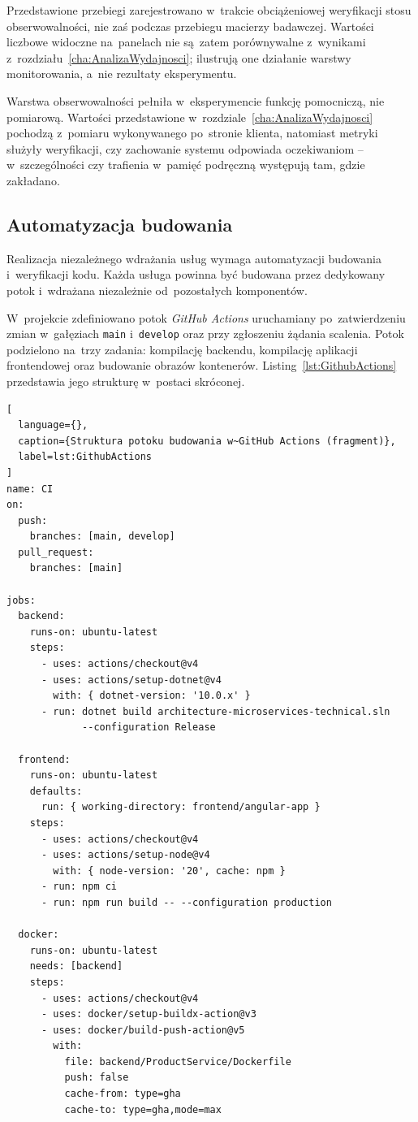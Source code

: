Przedstawione przebiegi zarejestrowano w~trakcie obciążeniowej weryfikacji stosu obserwowalności, nie zaś podczas przebiegu macierzy badawczej. Wartości liczbowe widoczne na~panelach nie są~zatem porównywalne z~wynikami z~rozdziału~\ref{cha:AnalizaWydajnosci}; ilustrują one działanie warstwy monitorowania, a~nie rezultaty eksperymentu.

Warstwa obserwowalności pełniła w~eksperymencie funkcję pomocniczą, nie pomiarową. Wartości przedstawione w~rozdziale~\ref{cha:AnalizaWydajnosci} pochodzą z~pomiaru wykonywanego po~stronie klienta, natomiast metryki służyły weryfikacji, czy zachowanie systemu odpowiada oczekiwaniom -- w~szczególności czy trafienia w~pamięć podręczną występują tam, gdzie zakładano.

\subsection{Automatyzacja budowania}
\label{subsec:CI}

Realizacja niezależnego wdrażania usług wymaga automatyzacji budowania i~weryfikacji kodu. Każda usługa powinna być budowana przez dedykowany potok i~wdrażana niezależnie od~pozostałych komponentów.

W~projekcie zdefiniowano potok \textit{GitHub Actions} uruchamiany po~zatwierdzeniu zmian w~gałęziach \texttt{main} i~\texttt{develop} oraz przy zgłoszeniu żądania scalenia. Potok podzielono na~trzy zadania: kompilację backendu, kompilację aplikacji frontendowej oraz budowanie obrazów kontenerów. Listing~\ref{lst:GithubActions} przedstawia jego strukturę w~postaci skróconej.

\begin{lstlisting}[
  language={},
  caption={Struktura potoku budowania w~GitHub Actions (fragment)},
  label=lst:GithubActions
]
name: CI
on:
  push:
    branches: [main, develop]
  pull_request:
    branches: [main]

jobs:
  backend:
    runs-on: ubuntu-latest
    steps:
      - uses: actions/checkout@v4
      - uses: actions/setup-dotnet@v4
        with: { dotnet-version: '10.0.x' }
      - run: dotnet build architecture-microservices-technical.sln
             --configuration Release

  frontend:
    runs-on: ubuntu-latest
    defaults:
      run: { working-directory: frontend/angular-app }
    steps:
      - uses: actions/checkout@v4
      - uses: actions/setup-node@v4
        with: { node-version: '20', cache: npm }
      - run: npm ci
      - run: npm run build -- --configuration production

  docker:
    runs-on: ubuntu-latest
    needs: [backend]
    steps:
      - uses: actions/checkout@v4
      - uses: docker/setup-buildx-action@v3
      - uses: docker/build-push-action@v5
        with:
          file: backend/ProductService/Dockerfile
          push: false
          cache-from: type=gha
          cache-to: type=gha,mode=max
\end{lstlisting}

